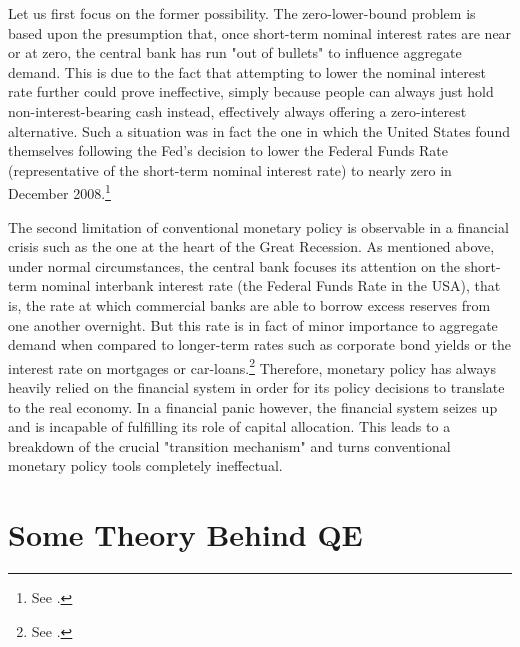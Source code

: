 \documentclass[11pt,a4paper,oneside]{book}
\begin{document}
Let us first focus on the former possibility. The zero-lower-bound problem is based upon the presumption that, once short-term nominal interest rates are near or at zero, the central bank has run "out of bullets" to influence aggregate demand. This is due to the fact that attempting to lower the nominal interest rate further could prove ineffective, simply because people can always just hold non-interest-bearing cash instead, effectively always offering a zero-interest alternative. Such a situation was in fact the one in which the United States found themselves following the Fed's decision to lower the Federal Funds Rate (representative of the short-term nominal interest rate) to nearly zero in December 2008.\footnote{See \citet{Blinder_2010}.}

The second limitation of conventional monetary policy is observable in a financial crisis such as the one at the heart of the Great Recession. As mentioned above, under normal circumstances, the central bank focuses its attention on the short-term nominal interbank interest rate (the Federal Funds Rate in the USA), that is, the rate at which commercial banks are able to borrow excess reserves from one another overnight. But this rate is in fact of minor importance to aggregate demand when compared to longer-term rates such as corporate bond yields or the interest rate on mortgages or car-loans.\footnote{See \citet{Blinder_2010}.} Therefore, monetary policy has always heavily relied on the financial system in order for its policy decisions to translate to the real economy. In a financial panic however, the financial system seizes up and is incapable of fulfilling its role of capital allocation. This leads to a breakdown of the crucial "transition mechanism" and turns conventional monetary policy tools completely ineffectual.

\section{Some Theory Behind QE}
\label{sec:Some_Theory_Behind_QE}
\end{document}
